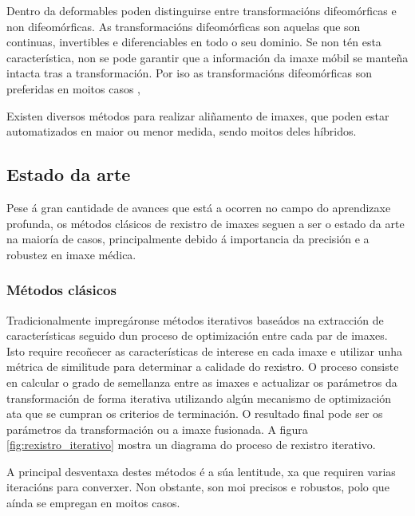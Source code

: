 Dentro da deformables poden distinguirse entre transformacións difeomórficas e non difeomórficas.
As transformacións difeomórficas son aquelas que son continuas, invertibles e diferenciables en todo o seu dominio.
Se non tén esta característica, non se pode garantir que a información da imaxe móbil se manteña intacta tras a transformación.
Por iso as transformacións difeomórficas son preferidas en moitos casos \cite{han2022diffeomorphicimageregistrationneural}, 

Existen diversos métodos para realizar aliñamento de imaxes, que poden estar automatizados en maior ou menor medida, sendo moitos deles híbridos. \cite{deeplernreview3dreg}


\subsection{Estado da arte}
\label{subsec:Estado da arte}

Pese á gran cantidade de avances que está a ocorren no campo do aprendizaxe profunda, os métodos clásicos de rexistro de imaxes seguen a ser o estado da arte na maioría de casos, 
principalmente debido á importancia da precisión e a robustez en imaxe médica.


\subsubsection{Métodos clásicos}
\label{subsubsec:Métodos clásicos}

Tradicionalmente impregáronse métodos iterativos baseádos na extracción de características 
seguido dun proceso de optimización entre cada par de imaxes. 
Isto require recoñecer as características de interese en cada imaxe e utilizar unha métrica de similitude 
para determinar a calidade do rexistro.
O proceso consiste en calcular o grado de semellanza entre as imaxes e 
actualizar os parámetros da transformación de forma iterativa utilizando algún mecanismo de optimización
 ata que se cumpran os criterios de terminación.
O resultado final pode ser os parámetros da transformación ou a imaxe fusionada.
A figura \ref{fig:rexistro_iterativo} mostra un diagrama do proceso de rexistro iterativo.

A principal desventaxa destes métodos é a súa lentitude, xa que requiren varias iteracións para converxer.
Non obstante, son moi precisos e robustos, polo que aínda se empregan en moitos casos.

